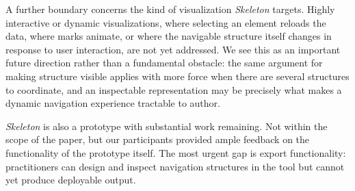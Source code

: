 \documentclass[12pt]{cmuthesis}
\begin{document}

A further boundary concerns the kind of visualization \textit{Skeleton} targets. Highly interactive or dynamic visualizations, where selecting an element reloads the data, where marks animate, or where the navigable structure itself changes in response to user interaction, are not yet addressed.  We see this as an important future direction rather than a fundamental obstacle: the same argument for making structure visible applies with more force when there are several structures to coordinate, and an inspectable representation may be precisely what makes a dynamic navigation experience tractable to author.

\textit{Skeleton} is also a prototype with substantial work remaining. Not within the scope of the paper, but our participants provided ample feedback on the functionality of the prototype itself. The most urgent gap is export functionality: practitioners can design and inspect navigation structures in the tool but cannot yet produce deployable output.


\end{document}
